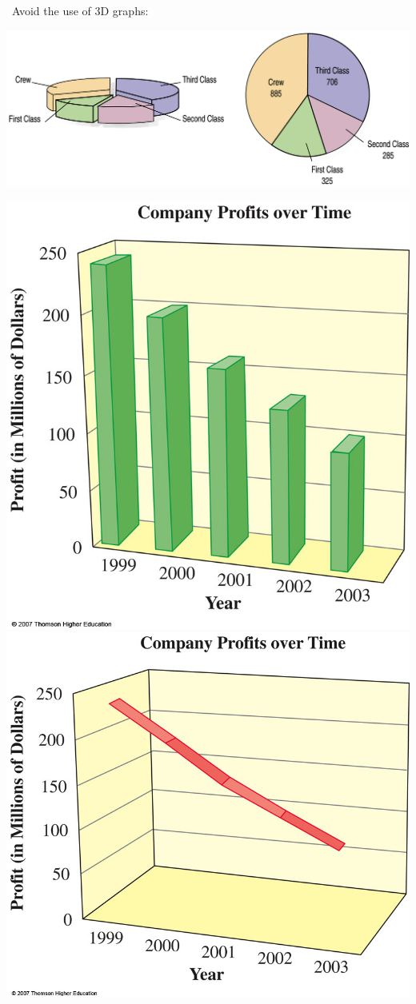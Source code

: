 \documentclass[../mathNotesPreamble]{subfiles}
\begin{document}
  \noindent\textbullet\ Avoid the use of 3D graphs:
  \begin{center}
    \includegraphics[width=0.9\linewidth]{images/math211_3d_pie_chart}
    
    \includegraphics[width=0.35\linewidth]{images/math211_3d_bar_chart}
    \includegraphics[width=0.35\linewidth]{images/math211_3d_line_chart}
  \end{center}

  \pagebreak
\end{document}
